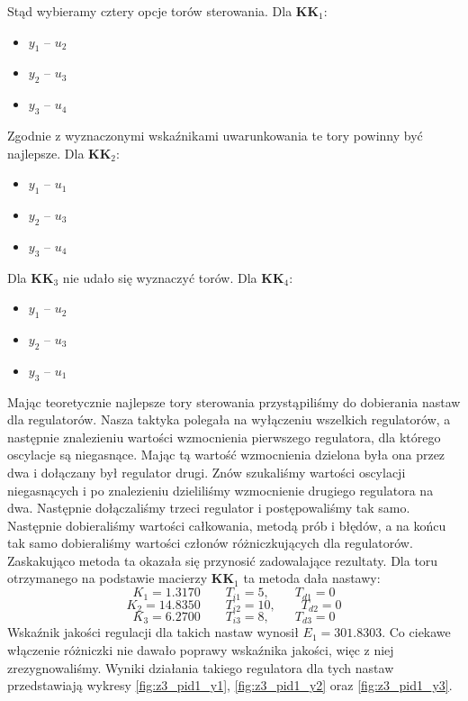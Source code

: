 Stąd wybieramy cztery opcje torów sterowania. Dla $\bm{KK}_1$:
\begin{itemize}
  \item $y_1$ -- $u_2$
 \item $y_2$ -- $u_3$
 \item $y_3$ -- $u_4$
\end{itemize}
Zgodnie z wyznaczonymi wskaźnikami uwarunkowania te tory powinny być najlepsze. Dla $\bm{KK}_2$:
\begin{itemize}
  \item $y_1$ -- $u_1$
 \item $y_2$ -- $u_3$
 \item $y_3$ -- $u_4$
\end{itemize}
Dla $\bm{KK}_3$ nie udało się wyznaczyć torów. Dla $\bm{KK}_4$:
\begin{itemize}
  \item $y_1$ -- $u_2$
 \item $y_2$ -- $u_3$
 \item $y_3$ -- $u_1$
\end{itemize}
Mając teoretycznie najlepsze tory sterowania przystąpiliśmy do dobierania nastaw
dla regulatorów. Nasza taktyka polegała na wyłączeniu wszelkich regulatorów, a
następnie znalezieniu wartości wzmocnienia pierwszego regulatora, dla którego
oscylacje są niegasnące. Mając tą wartość wzmocnienia dzielona była ona przez
dwa i dołączany był regulator drugi. Znów szukaliśmy wartości oscylacji niegasnących
i po znalezieniu dzieliliśmy wzmocnienie drugiego regulatora na dwa. Następnie
dołączaliśmy trzeci regulator i postępowaliśmy tak samo. Następnie dobieraliśmy
wartości całkowania, metodą prób i błędów, a na końcu tak samo dobieraliśmy
wartości członów różniczkujących dla regulatorów. Zaskakująco metoda ta okazała się
przynosić zadowalające rezultaty. Dla toru otrzymanego na podstawie macierzy $\bm{KK}_1$
ta metoda dała nastawy:
\begin{equation}
  K_1 = \num{1.3170} \qquad T_{i1} = 5, \qquad T_{d1} = 0 \nonumber
\end{equation}
\begin{equation}
  K_2 = \num{14.8350} \qquad T_{i2} = 10, \qquad T_{d2} = 0
\end{equation}
\begin{equation}
  K_3 = \num{6.2700} \qquad T_{i3} = 8, \qquad T_{d3} = 0 \nonumber
\end{equation}
Wskaźnik jakości regulacji dla takich nastaw wynosił $E_1 = \num{301.8303}$.
Co ciekawe włączenie różniczki nie dawało poprawy wskaźnika jakości, więc z niej
zrezygnowaliśmy.
Wyniki działania takiego regulatora dla tych nastaw przedstawiają wykresy \ref{fig:z3_pid1_y1},
\ref{fig:z3_pid1_y2} oraz \ref{fig:z3_pid1_y3}.


